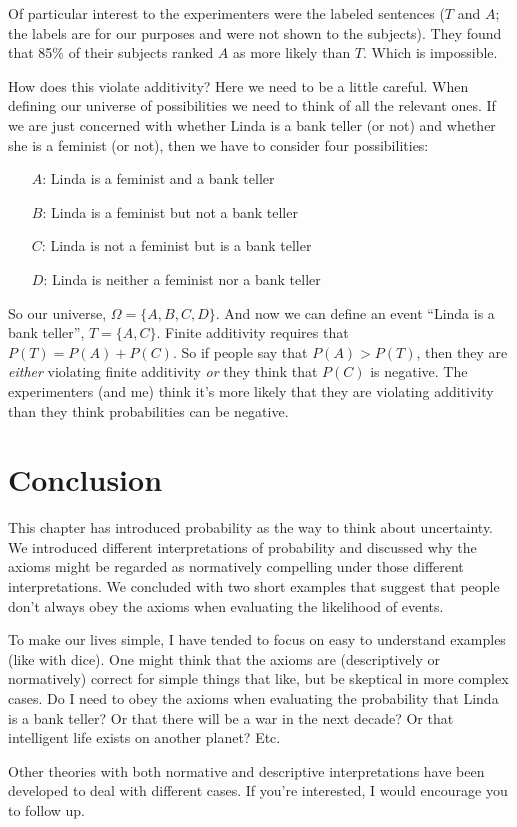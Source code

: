 Of particular interest to the experimenters were the labeled sentences ($T$ and $A$; the labels are for our purposes and were not shown to the subjects).  They found that 85\% of their subjects ranked $A$ as more likely than $T$.  Which is impossible. 

How does this violate additivity? Here we need to be a little careful.  When defining our universe of possibilities we need to think of all the relevant ones.  If we are just concerned with whether Linda is a bank teller (or not) and whether she is a feminist (or not), then we have to consider four possibilities: 

\begin{itemize}
\item[$A$:] Linda is a feminist and a bank teller
\item[$B$:] Linda is a feminist but not a bank teller
\item[$C$:] Linda is not a feminist but is a bank teller
\item[$D$:] Linda is neither a feminist nor a bank teller
\end{itemize}

So our universe, $\Omega = \{A, B, C, D\}$.  And now we can define an event ``Linda is a bank teller'', $T = \{A, C\}$. Finite additivity requires that $P(T) = P(A) + P(C)$.  So if people say that $P(A) > P(T)$, then they are {\it either} violating finite additivity {\it or} they think that $P(C)$ is negative.  The experimenters (and me) think it's more likely that they are violating additivity than they think probabilities can be negative.  

\section{Conclusion}

This chapter has introduced probability as the way to think about uncertainty. We introduced different interpretations of probability and discussed why the axioms might be regarded as normatively compelling under those different interpretations. We concluded with two short examples that suggest that people don't always obey the axioms when evaluating the likelihood of events.

To make our lives simple, I have tended to focus on easy to understand examples (like with dice).  One might think that the axioms are (descriptively or normatively) correct for simple things that like, but be skeptical in more complex cases. Do I need to obey the axioms when evaluating the probability that Linda is a bank teller? Or that there will be a war in the next decade? Or that intelligent life exists on another planet? Etc.

Other theories with both normative and descriptive interpretations have been developed to deal with different cases.  If you're interested, I would encourage you to follow up.